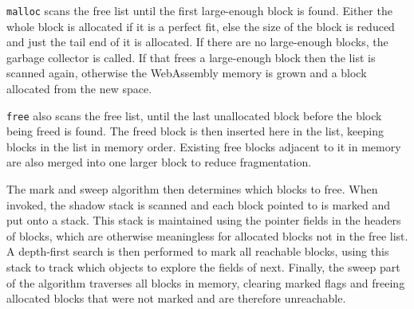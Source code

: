\verb|malloc| scans the free list until the first large-enough block is found. Either the whole block is allocated if it is a perfect fit, else the size of the block is reduced and just the tail end of it is allocated. If there are no large-enough blocks, the garbage collector is called.
If that frees a large-enough block then the list is scanned again, otherwise the WebAssembly memory is grown and a block allocated from the new space.


\verb|free| also scans the free list, until the last unallocated block before the block being freed is found. The freed block is then inserted here in the list, keeping blocks in the list in memory order. Existing free blocks adjacent to it in memory are also merged into one larger block to reduce fragmentation.

The mark and sweep algorithm then determines which blocks to free. When invoked, the shadow stack is scanned and each block pointed to is marked and put onto a stack. This stack is maintained using the pointer fields in the headers of blocks, which are otherwise meaningless for allocated blocks not in the free list. A depth-first search is then performed to mark all reachable blocks, using this stack to track which objects to explore the fields of next.
Finally, the sweep part of the algorithm traverses all blocks in memory, %
clearing marked flags and freeing allocated blocks that were not marked and are therefore unreachable.

